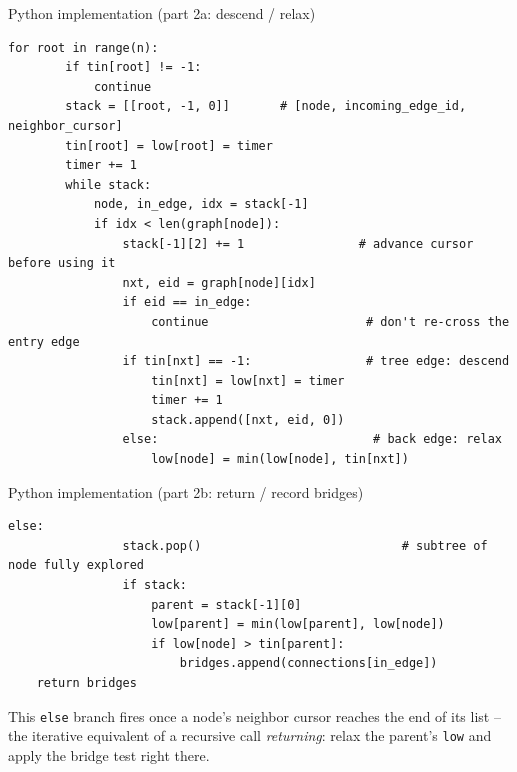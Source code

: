\documentclass[11pt,aspectratio=169]{beamer}
\begin{document}
\begin{frame}[fragile]{Python implementation (part 2a: descend / relax)}
  \begin{lstlisting}[style=py,aboveskip=0pt,belowskip=0pt]
    for root in range(n):
        if tin[root] != -1:
            continue
        stack = [[root, -1, 0]]       # [node, incoming_edge_id, neighbor_cursor]
        tin[root] = low[root] = timer
        timer += 1
        while stack:
            node, in_edge, idx = stack[-1]
            if idx < len(graph[node]):
                stack[-1][2] += 1                # advance cursor before using it
                nxt, eid = graph[node][idx]
                if eid == in_edge:
                    continue                      # don't re-cross the entry edge
                if tin[nxt] == -1:                # tree edge: descend
                    tin[nxt] = low[nxt] = timer
                    timer += 1
                    stack.append([nxt, eid, 0])
                else:                              # back edge: relax
                    low[node] = min(low[node], tin[nxt])
  \end{lstlisting}
\end{frame}

\begin{frame}[fragile]{Python implementation (part 2b: return / record bridges)}
  \begin{lstlisting}[style=py]
            else:
                stack.pop()                            # subtree of node fully explored
                if stack:
                    parent = stack[-1][0]
                    low[parent] = min(low[parent], low[node])
                    if low[node] > tin[parent]:
                        bridges.append(connections[in_edge])
    return bridges
  \end{lstlisting}
  \vspace{0.5em}
  This \texttt{else} branch fires once a node's neighbor cursor reaches the end of its
  list -- the iterative equivalent of a recursive call \emph{returning}: relax the
  parent's \texttt{low} and apply the bridge test right there.
\end{frame}
\end{document}
